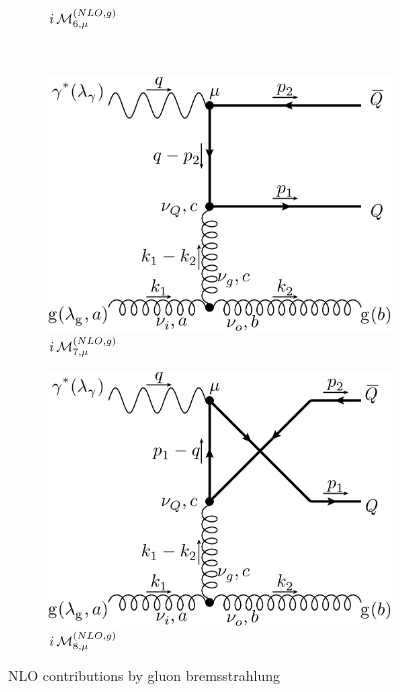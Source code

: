 \begin{figure}[ht!]
\begin{subfigure}[t]{.4\textwidth}
		\caption{$i\operatorname{\mathcal M}^{(NLO,g)}_{6,\mu}$}
	\end{subfigure}\\
	\begin{subfigure}[t]{.42\textwidth}
		\includegraphics[width=\textwidth]{pyfeyn/nlo-g-7}
		\caption{$i\operatorname{\mathcal M}^{(NLO,g)}_{7,\mu}$}
	\end{subfigure}\hspace{.1\textwidth}%
	\begin{subfigure}[t]{.42\textwidth}
		\includegraphics[width=\textwidth]{pyfeyn/nlo-g-8}
		\caption{$i\operatorname{\mathcal M}^{(NLO,g)}_{8,\mu}$}
	\end{subfigure}
	\caption{NLO contributions by gluon bremsstrahlung}\label{fig:FeynNLOg}
\end{figure}

